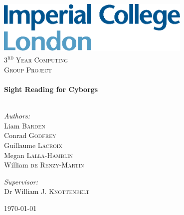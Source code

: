 \begin{titlepage}
    \begin{center}
        \includegraphics[width=0.70\textwidth]{./assets/imperial}~\\[1cm]
        \textsc{\LARGE 3\textsuperscript{rd} Year Computing} \\[0.5cm]
        \textsc{\LARGE Group Project} \\[0.5cm]
        \HRule \\[0.4cm]
        {\huge \bfseries Sight Reading for Cyborgs \\[0.4cm]}
        \HRule \\[1.5cm]
            \begin{flushleft}
                \large
                \emph{Authors:}\\
                Liam \textsc{Barden}\\
                Conrad \textsc{Godfrey}\\
                Guillaume \textsc{Lacroix}\\
                Megan \textsc{Lalla-Hamblin}\\
                William \textsc{de Renzy-Martin}\\
            \end{flushleft}
            \begin{flushright}
                \large
                \emph{Supervisor:}\\
                Dr William J. \textsc{Knottenbelt}
            \end{flushright}
        \vfill
        {\large \today}
    \end{center}
\end{titlepage}
